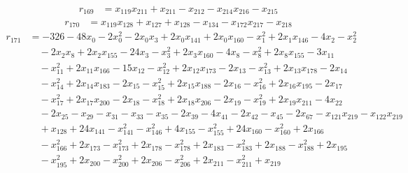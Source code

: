 \begin{align*}
r_{169}&=
x_{119}x_{211}+x_{211}-x_{212}-x_{214}x_{216}-x_{215}
\end{align*}
\begin{align*}
r_{170}&=
x_{119}x_{128}+x_{127}+x_{128}-x_{134}-x_{172}x_{217}-x_{218}
\end{align*}
\begin{align*}
r_{171}&=
-326-48x_{0}-2x_{0}^{2}-2x_{0}x_{3}+2x_{0}x_{141}+2x_{0}x_{160}-x_{1}^{2}+2x_{1}x_{146}-4x_{2}-x_{2}^{2} \\
&\quad -2x_{2}x_{8}+2x_{2}x_{155}-24x_{3}-x_{3}^{2}+2x_{3}x_{160}-4x_{8}-x_{8}^{2}+2x_{8}x_{155}-3x_{11} \\
&\quad -x_{11}^{2}+2x_{11}x_{166}-15x_{12}-x_{12}^{2}+2x_{12}x_{173}-2x_{13}-x_{13}^{2}+2x_{13}x_{178}-2x_{14} \\
&\quad -x_{14}^{2}+2x_{14}x_{183}-2x_{15}-x_{15}^{2}+2x_{15}x_{188}-2x_{16}-x_{16}^{2}+2x_{16}x_{195}-2x_{17} \\
&\quad -x_{17}^{2}+2x_{17}x_{200}-2x_{18}-x_{18}^{2}+2x_{18}x_{206}-2x_{19}-x_{19}^{2}+2x_{19}x_{211}-4x_{22} \\
&\quad -2x_{25}-x_{29}-x_{31}-x_{33}-x_{35}-2x_{39}-4x_{41}-2x_{42}-x_{45}-2x_{67}-x_{121}x_{219}-x_{122}x_{219} \\
&\quad +x_{128}+24x_{141}-x_{141}^{2}-x_{146}^{2}+4x_{155}-x_{155}^{2}+24x_{160}-x_{160}^{2}+2x_{166} \\
&\quad -x_{166}^{2}+2x_{173}-x_{173}^{2}+2x_{178}-x_{178}^{2}+2x_{183}-x_{183}^{2}+2x_{188}-x_{188}^{2}+2x_{195} \\
&\quad -x_{195}^{2}+2x_{200}-x_{200}^{2}+2x_{206}-x_{206}^{2}+2x_{211}-x_{211}^{2}+x_{219}
\end{align*}
